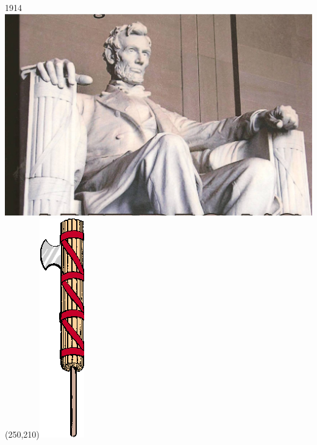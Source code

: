 \begin{frame}{1914}
    \centering
    \includegraphics[width=.9\textwidth]{img/lincoln-memorial.jpg} \\
    \pause
    \Put(250,210){\includegraphics[height=0.55\textwidth]{img/fasces.png}}
\end{frame}

